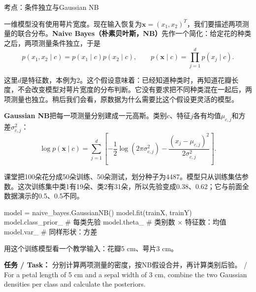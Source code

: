 

考点：条件独立与Gaussian NB




一维模型没有使用萼片宽度。现在输入恢复为\(\mathbf x=(x_1,x_2)^T\)，我们要描述两项测量的联合分布。\textbf{Naive Bayes（朴素贝叶斯，NB）}先作一个简化：给定花的种类之后，两项测量条件独立，于是
\[
p(x_1,x_2\mid c)=p(x_1\mid c)p(x_2\mid c),\qquad
p(\mathbf x\mid c)=\prod_{j=1}^d p(x_j\mid c).
\tag{2.15}
\]


这里\(d\)是特征数，本例为2。这个假设意味着：已经知道种类时，再知道花瓣长度，不会改变模型对萼片宽度的分布判断。它没有要求把不同种类混在一起后，两项测量也独立。稍后我们会看，原数据为什么需要比这个假设更灵活的模型。


\textbf{Gaussian NB}把每一项测量分别建成一元高斯。类别\(c\)、特征\(j\)各有均值\(\mu_{c,j}\)和方差\(\sigma_{c,j}^2\)：
\[
\log p(\mathbf x\mid c)=\sum_{j=1}^d
\left[-\frac12\log(2\pi\sigma_{c,j}^2)
-\frac{(x_j-\mu_{c,j})^2}{2\sigma_{c,j}^2}\right].
\tag{2.16}
\]


课堂把100朵花分成50朵训练、50朵测试，划分种子为4487。模型只从训练集估参数。这次训练集中类1有19朵、类2有31朵，所以先验变成0.38、0.62；它与前面全数据演示的0.5、0.5不同。



\begin{StudyCode}
model = naive_bayes.GaussianNB()
model.fit(trainX, trainY)
model.class_prior_  # 每类先验
model.theta_        # 类别数 × 特征数：均值
model.var_          # 同样形状：方差
\end{StudyCode}


用这个训练模型看一个教学输入：花瓣5 cm、萼片3 cm。


\textbf{任务 / Task：} 分别计算两项测量的密度，按NB假设合并，再计算类别后验。 / For a petal length of 5 cm and a sepal width of 3 cm, combine the two Gaussian densities per class and calculate the posteriors.


